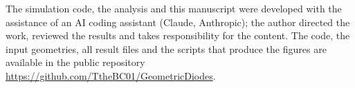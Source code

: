 \documentclass[aps,prapplied,twocolumn,superscriptaddress,floatfix,longbibliography]{revtex4-2}
\begin{document}
\maketitle









\begin{acknowledgments}
The simulation code, the analysis and this manuscript were developed with the
assistance of an AI coding assistant (Claude, Anthropic); the author directed
the work, reviewed the results and takes responsibility for the content. The
code, the input geometries, all result files and the scripts that produce the
figures are available in the public repository
\url{https://github.com/TtheBC01/GeometricDiodes}.
\end{acknowledgments}

\appendix



\end{document}
